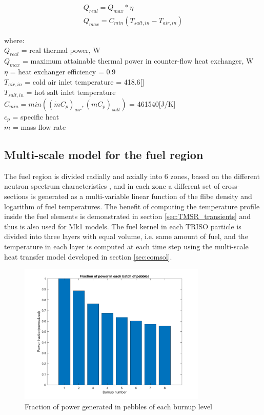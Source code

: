 \documentclass{elsarticle}
\begin{document}
\begin{align}
    Q_{real} = Q_{max} * \eta\\
    Q_{max} = C_{min}(T_{salt,in} - T_{air, in})
\end{align}

where:\\
$Q_{real}$ = real thermal power, W\\
$Q_{max}$ = maximum attainable thermal power in counter-flow heat exchanger, W\\
$\eta$ = heat exchanger efficiency = 0.9\\
$T_{air, in}$ = cold air inlet temperature = 418.6[\degc] \\
$T_{salt, in}$ = hot salt inlet temperature\\
$C_{min} = min((\dot{m}C_p)_{air}, (\dot{m}C_p)_{salt})$ = 461540[J/K]\\
$c_p$ = specific heat\\
$\dot{m}$ = mass flow rate\\

 

\subsection{Multi-scale model for the fuel region}

The fuel region is divided radially and axially into 6 zones, based on the different neutron spectrum characteristics \cite{Cisneros2013}, and in each zone a different set of cross-sections is generated as a multi-variable linear function of the flibe density and logarithm of fuel temperatures. 
The benefit of computing the temperature profile inside the fuel elements is demonstrated in section \ref{sec:TMSR_transients} and thus is also used for Mk1 models.
The fuel kernel in each TRISO particle is divided into three layers with equal volume, i.e. same amount of fuel, and the temperature in each layer is computed at each time step using the multi-scale heat transfer model developed in section \ref{sec:comsol}.

\begin{figure}
     \centering
     \includegraphics[width=0.8\textwidth]{images/diffusion/mk1/power_barchart.png}
     \caption{Fraction of power generated in pebbles of each burnup level}
     \label{fig:power_fraction}
\end{figure}
\end{document}
